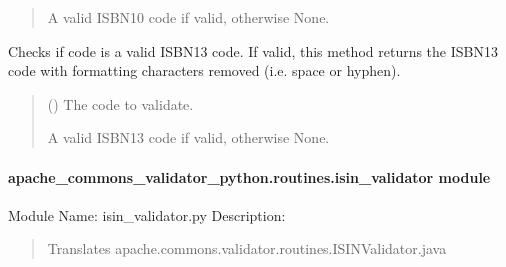 \documentclass[letterpaper,10pt,english]{sphinxmanual}
\begin{document}
\begin{fulllineitems}
\begin{fulllineitems}
\begin{quote}
\begin{description}
\sphinxAtStartPar
A valid ISBN\sphinxhyphen{}10 code if valid, otherwise None.

\end{description}\end{quote}

\end{fulllineitems}


\begin{fulllineitems}
\label{\detokenize{apache_commons_validator_python.routines:apache_commons_validator_python.routines.isbn_validator.ISBNValidator.validate_isbn13}}
\pysigstartsignatures
{}
\pysigstopsignatures
\sphinxAtStartPar
Checks if code is a valid ISBN\sphinxhyphen{}13 code. If valid, this method returns the
ISBN\sphinxhyphen{}13 code with formatting characters removed (i.e. space or hyphen).
\begin{quote}\begin{description}
\sphinxAtStartPar
{} () \textendash{} The code to validate.

\sphinxAtStartPar
A valid ISBN\sphinxhyphen{}13 code if valid, otherwise None.

\end{description}\end{quote}

\end{fulllineitems}


\end{fulllineitems}



\paragraph{apache\_commons\_validator\_python.routines.isin\_validator module}
\label{\detokenize{apache_commons_validator_python.routines:module-apache_commons_validator_python.routines.isin_validator}}\label{\detokenize{apache_commons_validator_python.routines:apache-commons-validator-python-routines-isin-validator-module}}
\sphinxAtStartPar
Module Name: isin\_validator.py
Description:
\begin{quote}

\sphinxAtStartPar
Translates apache.commons.validator.routines.ISINValidator.java
\end{quote}
\end{document}
